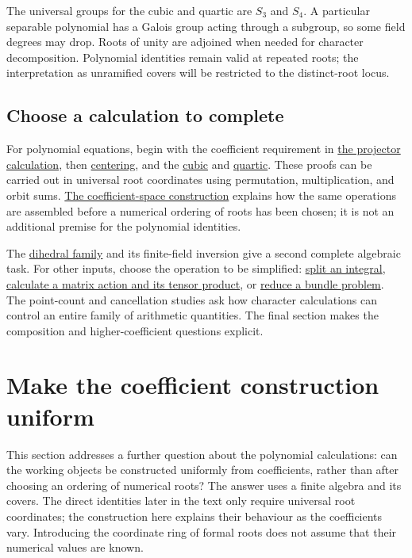 \documentclass[11pt]{article}
\theoremstyle{remark}
\begin{document}
The universal groups for the cubic and quartic are \(S_3\) and \(S_4\). A particular separable polynomial has a Galois group acting through a subgroup, so some field degrees may drop. Roots of unity are adjoined when needed for character decomposition. Polynomial identities remain valid at repeated roots; the interpretation as unramified covers will be restricted to the distinct-root locus.

\subsection{Choose a calculation to complete}

For polynomial equations, begin with the coefficient requirement in \hyperref[fourier:section]{the projector calculation}, then \hyperref[sec:centering]{centering}, and the \hyperref[cardano:section]{cubic} and \hyperref[ferrari:section]{quartic}. These proofs can be carried out in universal root coordinates using permutation, multiplication, and orbit sums. \hyperref[cover:section]{The coefficient-space construction} explains how the same operations are assembled before a numerical ordering of roots has been chosen; it is not an additional premise for the polynomial identities.

The \hyperref[dihedral:section]{dihedral family} and its finite-field inversion give a second complete algebraic task. For other inputs, choose the operation to be simplified: \hyperref[geometry:genus-two]{split an integral}, \hyperref[circle:section]{calculate a matrix action and its tensor product}, or \hyperref[categorical:section]{reduce a bundle problem}. The point-count and cancellation studies ask how character calculations can control an entire family of arithmetic quantities. The final section makes the composition and higher-coefficient questions explicit.

\section{Make the coefficient construction uniform}
\label{cover:section}

This section addresses a further question about the polynomial calculations: can the working objects be constructed uniformly from coefficients, rather than after choosing an ordering of numerical roots? The answer uses a finite algebra and its covers. The direct identities later in the text only require universal root coordinates; the construction here explains their behaviour as the coefficients vary. Introducing the coordinate ring of formal roots does not assume that their numerical values are known.
\end{document}
